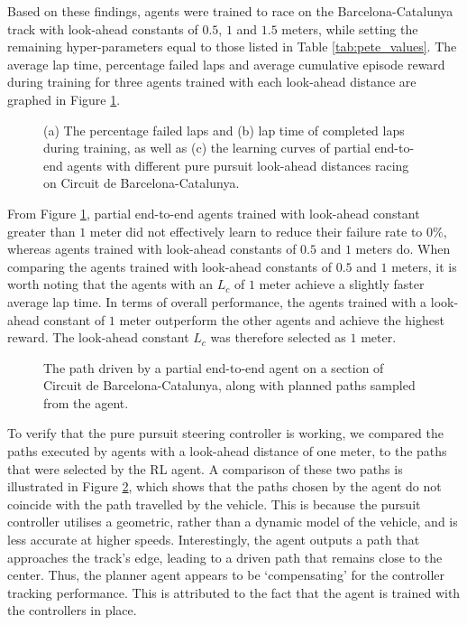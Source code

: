Based on these findings, agents were trained to race on the Barcelona-Catalunya track with look-ahead constants of $0.5$, $1$ and $1.5$ meters, while setting the remaining hyper-parameters equal to those listed in Table \ref{tab:pete_values}.
The average lap time, percentage failed laps and average cumulative episode reward during training for three agents trained with each look-ahead distance are graphed in Figure \ref{fig:lfc_curves}.

\begin{figure}[t]
    \centering
    
    \caption[Learning curves for tuning the steering controller look-ahead constant of a partial end-to-end agent]{(a) The percentage failed laps and (b) lap time of completed laps during training, as well as (c) the learning curves of partial end-to-end agents with different pure pursuit look-ahead distances racing on Circuit de Barcelona-Catalunya.}
    \label{fig:lfc_curves}
\end{figure}

From Figure \ref{fig:lfc_curves}, partial end-to-end agents trained with look-ahead constant greater than $1$ meter did not effectively learn to reduce their failure rate to $0\%$, whereas agents trained with  look-ahead constants of $0.5$ and $1$ meters do.
When comparing the agents trained with look-ahead constants of $0.5$ and $1$ meters, it is worth noting that the agents with an $L_c$ of $1$ meter achieve a slightly faster average lap time. 
In terms of overall performance, the agents trained with a look-ahead constant of $1$ meter outperform the other agents and achieve the highest reward.
The look-ahead constant $L_c$ was therefore selected as $1$ meter.

\begin{figure}[b]
    \centering
    
    \caption[The path driven by a partial end-to-end agent on a section of Circuit de Barcelona-Catalunya]{The path driven by a partial end-to-end agent on a section of Circuit de Barcelona-Catalunya, along with planned paths sampled from the agent.}
    \label{fig:lfc_paths}
\end{figure}


To verify that the pure pursuit steering controller is working, we compared the paths executed by agents with a look-ahead distance of one meter, to the paths that were selected by the RL agent.
A comparison of these two paths is illustrated in Figure \ref{fig:lfc_paths}, which shows that the paths chosen by the agent do not coincide with the path travelled by the vehicle.
This is because the pursuit controller utilises a geometric, rather than a dynamic model of the vehicle, and is less accurate at higher speeds.
Interestingly, the agent outputs a path that approaches the track's edge, leading to a driven path that remains close to the center.
Thus, the planner agent appears to be `compensating' for the controller tracking performance.
This is attributed to the fact that the agent is trained with the controllers in place.





